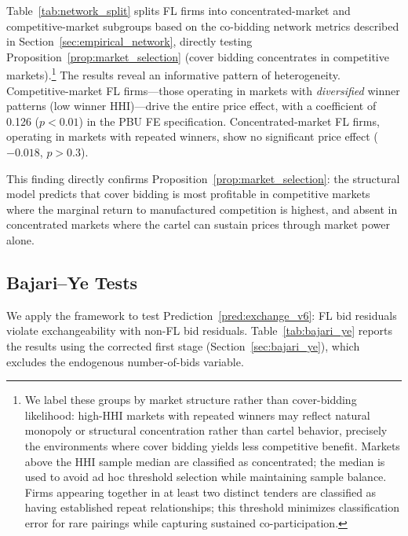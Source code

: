 Table~\ref{tab:network_split} splits FL firms into
concentrated-market and competitive-market subgroups based on the
co-bidding network metrics described in
Section~\ref{sec:empirical_network}, directly testing
Proposition~\ref{prop:market_selection} (cover bidding concentrates in
competitive markets).\footnote{We label these groups by
market structure rather than cover-bidding likelihood: high-HHI markets
with repeated winners may reflect natural monopoly or structural
concentration rather than cartel behavior, precisely the environments
where cover bidding yields less competitive benefit.
Markets above the HHI sample median are classified as concentrated;
the median is used to avoid ad hoc threshold selection while maintaining
sample balance. Firms appearing together in at least two distinct
tenders are classified as having established repeat relationships;
this threshold minimizes classification error for rare pairings while
capturing sustained co-participation.}
The results reveal an informative pattern of heterogeneity.
Competitive-market FL firms---those operating in markets with
\emph{diversified} winner patterns (low winner HHI)---drive the entire
price effect, with a coefficient of 0.126 ($p < 0.01$) in the PBU FE
specification. Concentrated-market FL firms, operating in markets with
repeated winners, show no significant price effect ($-0.018$, $p > 0.3$).

This finding directly confirms Proposition~\ref{prop:market_selection}:
the structural model predicts that cover bidding is most profitable in
competitive markets where the marginal return to manufactured
competition is highest, and absent in concentrated markets where the
cartel can sustain prices through market power alone.




\subsection{Bajari--Ye Tests}
\label{sec:results_bajari}

We apply the \citet{bajari2003deciding} framework to test
Prediction~\ref{pred:exchange_v6}: FL bid residuals violate
exchangeability with non-FL bid residuals.
Table~\ref{tab:bajari_ye} reports the results using the corrected
first stage (Section~\ref{sec:bajari_ye}), which excludes the
endogenous number-of-bids variable.

